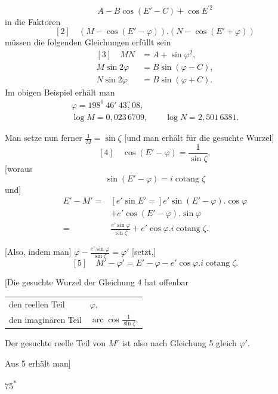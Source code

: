 \[
A-B\cos(E'-C)+\cos E^{\prime2}
\]
in die Faktoren
\[
[2]\quad(M-\cos(E'-\varphi))\mathord{.}(N-\cos(E'+\varphi))
\]
müssen die folgenden Gleichungen erfüllt sein
\[
\begin{aligned}
{[3]}\quad MN&=A+\sin\varphi^2,\\
M\sin2\varphi&=B\sin(\varphi-C),\\
N\sin2\varphi&=B\sin(\varphi+C).
\end{aligned}
\]
Im obigen Beispiel erhält man
\[
\begin{gathered}
\varphi=198^0\ 46'\ 43\overset{\prime\prime}{,}08,\\
\log M=0{,}023\,6709,\qquad
\log N=2{,}501\,6381.
\end{gathered}
\]
\par\noindent\hspace*{\parindent}Man setze nun ferner \(\frac1M=\sin\zeta\) [und man erhält für die gesuchte Wurzel]
\[
[4]\quad\cos(E'-\varphi)=\frac1{\sin\zeta},
\]
[woraus
\[
\sin(E'-\varphi)=i\operatorname{cotang}\zeta
\]
und]
\[
\begin{aligned}
E'-M'={}&[e'\sin E'=]e'\sin(E'-\varphi)\mathord{.}\cos\varphi\\
&+e'\cos(E'-\varphi)\mathord{.}\sin\varphi\\
={}&\frac{e'\sin\varphi}{\sin\zeta}
  +e'\cos\varphi\mathord{.}i\operatorname{cotang}\zeta.
\end{aligned}
\]
\par\noindent\hspace*{\parindent}[Also, indem man] \(\varphi-\frac{e'\sin\varphi}{\sin\zeta}=\varphi'\) [setzt,]
\[
[5]\quad M'-\varphi'=E'-\varphi-e'\cos\varphi\mathord{.}i\operatorname{cotang}\zeta.
\]
\par\noindent\hspace*{\parindent}[Die gesuchte Wurzel der Gleichung 4 hat offenbar
\begin{center}
\begin{tabular}{@{}ll@{}}
den reellen Teil & \(\varphi\),\\
den imaginären Teil & \(\operatorname{arc}\cos\frac1{\sin\zeta}\).\\
\end{tabular}
\end{center}
Der gesuchte reelle Teil von \(M'\) ist also nach Gleichung 5 gleich \(\varphi'\).
\par\noindent\hspace*{\parindent}Aus 5 erhält man]
\par\noindent\hfill75\textsuperscript{*}\par
